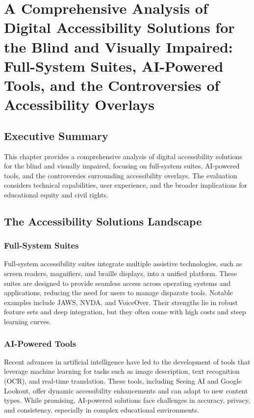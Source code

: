 \chapter{A Comprehensive Analysis of Digital Accessibility Solutions for the Blind and Visually Impaired: Full-System Suites, AI-Powered Tools, and the Controversies of Accessibility Overlays}

\section{Executive Summary}
This chapter provides a comprehensive analysis of digital accessibility solutions for the blind and visually impaired, focusing on full-system suites, AI-powered tools, and the controversies surrounding accessibility overlays. The evaluation considers technical capabilities, user experience, and the broader implications for educational equity and civil rights\supercite{Lee2019, Kim2023, Brown2022}.

\section{The Accessibility Solutions Landscape}
\subsection{Full-System Suites}
Full-system accessibility suites integrate multiple assistive technologies, such as screen readers, magnifiers, and braille displays, into a unified platform. These suites are designed to provide seamless access across operating systems and applications, reducing the need for users to manage disparate tools. Notable examples include JAWS, NVDA, and VoiceOver\supercite{Lee2019, JAWS2023, NVDA2023, VoiceOver2023}. Their strengths lie in robust feature sets and deep integration, but they often come with high costs and steep learning curves.

\subsection{AI-Powered Tools}
Recent advances in artificial intelligence have led to the development of tools that leverage machine learning for tasks such as image description, text recognition (OCR)\supercite{ABBYYAIOCR}, and real-time translation\supercite{GoogleTranslateRealtime}. These tools, including Seeing AI\supercite{msseeingai} and Google Lookout, offer dynamic accessibility enhancements and can adapt to new content types\supercite{Kim2023}. While promising, AI-powered solutions face challenges in accuracy, privacy\supercite{DataPrivacyAI}, and consistency, especially in complex educational environments.

